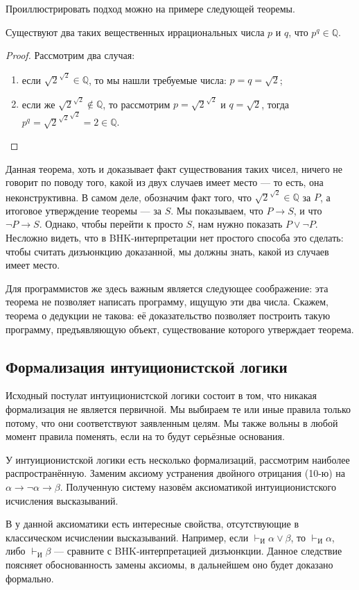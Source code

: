 Проиллюстрировать подход можно на примере следующей теоремы.

\begin{theorem}
Существуют два таких вещественных иррациональных числа $p$ и $q$, что $p^q \in \mathbb{Q}$.
\end{theorem}

\begin{proof}
Рассмотрим два случая:
\begin{enumerate}
\item если $\sqrt{2}^{\sqrt{2}} \in \mathbb{Q}$, то мы нашли требуемые числа: $p = q = \sqrt{2}$;
\item если же $\sqrt{2}^{\sqrt{2}} \notin \mathbb{Q}$, то рассмотрим $p = \sqrt{2}^{\sqrt{2}}$
и $q = \sqrt{2}$, тогда $p^q = {\sqrt{2}^{\sqrt{2}}}^{\sqrt{2}} = 2 \in \mathbb{Q}$.
\end{enumerate}
\end{proof}

Данная теорема, хоть и доказывает факт существования таких чисел, ничего не говорит по поводу
того, какой из двух случаев имеет место --- то есть, она неконструктивна. 
В самом деле, 
обозначим факт того, что $\sqrt{2}^{\sqrt{2}} \in \mathbb{Q}$ за $P$, а итоговое утверждение теоремы
--- за $S$. Мы показываем, что $P \rightarrow S$, и что $\neg P \rightarrow S$.
Однако, чтобы перейти к просто $S$, нам нужно показать $P \vee \neg P$. Несложно видеть,
что в BHK-интерпретации нет простого способа это сделать: чтобы считать дизъюнкцию доказанной,
мы должны знать, какой из случаев имеет место.

Для программистов же здесь важным является следующее соображение: эта теорема не 
позволяет написать программу, ищущую эти два числа. Скажем, теорема о дедукции не такова: 
её доказательство позволяет построить такую программу, предъявляющую объект,
существование которого утверждает теорема. 

\subsection*{Формализация интуиционистской логики}

Исходный постулат интуиционистской логики состоит в том, что никакая формализация не является
первичной. Мы выбираем те или иные правила только потому, что они соответствуют заявленным
целям. Мы также вольны в любой момент правила поменять, если на то будут серьёзные основания.

У интуиционистской логики есть несколько формализаций, рассмотрим наиболее распространённую.
Заменим аксиому устранения двойного отрицания (10-ю) на 
$\alpha \rightarrow \neg \alpha \rightarrow \beta$.
Полученную систему назовём аксиоматикой интуиционистского исчисления высказываний.

В у данной аксиоматики есть интересные свойства, отсутствующие в классическом исчислении
высказываний. Например, если $\vdash_\texttt{И} \alpha \vee \beta$, то $\vdash_\texttt{И} \alpha$, либо
$\vdash_\texttt{И} \beta$ --- сравните с BHK-интерпретацией дизъюнкции. 
Данное следствие поясняет обоснованность замены аксиомы, в дальнейшем оно будет доказано
формально.
